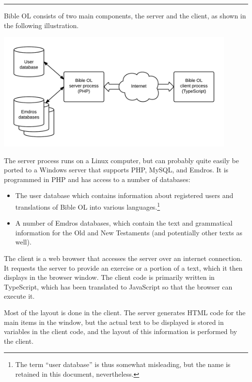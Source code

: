 \documentclass[11pt,oneside,a4paper]{memoir}
\begin{document}
\plainbreak{3}

Bible OL consists of two main components, the server and the
client, as shown in the following illustration.

\begin{center}
  \includegraphics[width=0.9\textwidth]{BOL_overview.png}
\end{center}

The server process runs on a Linux computer, but can probably quite easily be ported to a Windows server
that supports PHP, MySQL, and Emdros. It is programmed in PHP and has access to a number of
databases:

\begin{itemize}
\item The user database which contains information about registered users and
  translations of Bible OL into various languages.\footnote{The term ``user database'' is thus
    somewhat misleading, but the name is retained in this document, nevertheless.}
\item A number of Emdros databases, which contain the text and grammatical information for the Old
  and New Testaments (and potentially other texts as well).
\end{itemize}

The client is a web browser that accesses the server over an
internet connection. It requests the server to provide an exercise or a portion of a text, which it
then displays in the browser window. The client code is primarily written in
TypeScript, which has been translated to JavaScript so that the
browser can execute it.

Most of the layout is done in the client. The server generates HTML code for the main items in the
window, but the actual text to be displayed is stored in variables in the client code, and the layout of
this information is performed by the client.
\end{document}

